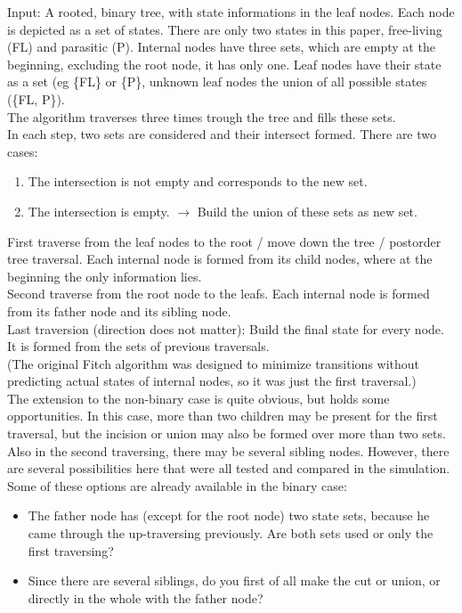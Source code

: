         Input: A rooted, binary tree, with state informations in the leaf nodes. Each node is depicted as 
          a set of states. There are only two states in this paper, free-living (FL) and parasitic (P). 
          Internal nodes have three sets, which are empty at the beginning, excluding the root node, it 
          has only one. Leaf nodes have their state as a set (eg \{FL\} or \{P\}, unknown leaf nodes the 
          union of all possible states (\{FL, P\}). \\
        The algorithm traverses three times trough the tree and fills these sets. \\
        In each step, two sets are considered and their intersect formed. There are two cases:
        \begin{enumerate}
          \item The intersection is not empty and corresponds to the new set.
          \item The intersection is empty. $\rightarrow$ Build the union of these sets as new set.
        \end{enumerate}
        First traverse from the leaf nodes to the root / move down the tree / postorder tree traversal. 
          Each internal node is formed from its child nodes, where at the beginning the only information
          lies. \\
        Second traverse from the root node to the leafs. Each internal node is formed from its father node 
          and its sibling node. \\
        Last traversion (direction does not matter): Build the final state for every node. It is formed 
          from the sets of previous traversals. \\
        (The original Fitch algorithm was designed to minimize transitions without predicting actual states 
          of internal nodes, so it was just the first traversal.) \\
        The extension to the non-binary case is quite obvious, but holds some opportunities. In this case, 
          more than two children may be present for the first traversal, but the incision or union may 
          also be formed over more than two sets. Also in the second traversing, there may be several 
          sibling nodes. However, there are several possibilities here that were all tested and compared 
          in the simulation. Some of these options are already available in the binary case:
        \begin{itemize}
          \item The father node has (except for the root node) two state sets, because he came through 
            the up-traversing previously. Are both sets used or only the first traversing?
          \item Since there are several siblings, do you first of all make the cut or union, or directly 
            in the whole with the father node?
        \end{itemize}
